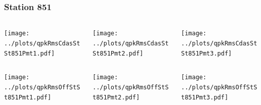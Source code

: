 \documentclass[aspectratio=169]{beamer}
\begin{document}
\begin{frame} 
  \frametitle{Station 851}
  \begin{center}
    \begin{columns}
      \begin{column}{0.33\textwidth}
        \texttt{[image: ../plots/qpkRmsCdasStSt851Pmt1.pdf]}
      \end{column}
      \begin{column}{0.33\textwidth}
        \texttt{[image: ../plots/qpkRmsCdasStSt851Pmt2.pdf]}
      \end{column}
      \begin{column}{0.33\textwidth}
        \texttt{[image: ../plots/qpkRmsCdasStSt851Pmt3.pdf]}
      \end{column}
    \end{columns}
  \end{center}

  \begin{center}
    \begin{columns}
      \begin{column}{0.33\textwidth}
        \texttt{[image: ../plots/qpkRmsOffStSt851Pmt1.pdf]}
      \end{column}
      \begin{column}{0.33\textwidth}
        \texttt{[image: ../plots/qpkRmsOffStSt851Pmt2.pdf]}
      \end{column}
      \begin{column}{0.33\textwidth}
        \texttt{[image: ../plots/qpkRmsOffStSt851Pmt3.pdf]}
      \end{column}
    \end{columns}
  \end{center}
\end{frame}
\end{document}
